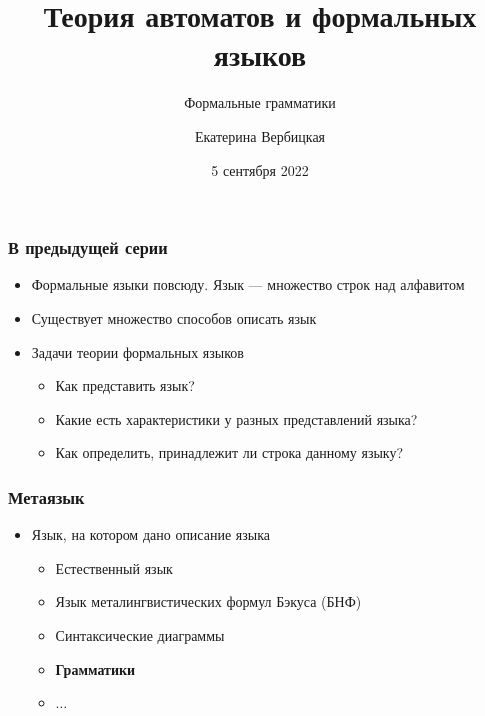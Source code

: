 \documentclass{beamer}
\title[]{Теория автоматов и формальных языков}
\subtitle[]{Формальные грамматики}
\institute[]{
НИУ-ВШЭ\\
}
\author[]{Екатерина Вербицкая}
\date{5 сентября 2022}
\begin{document}
{
  \begin{frame}
    \titlepage
  \end{frame}
}

\begin{frame}[fragile]
  \transwipe[direction=90]
  \frametitle{В предыдущей серии}
  \begin{itemize}
    \item Формальные языки повсюду. Язык --- множество строк над алфавитом
    \item Существует множество способов описать язык
    \item Задачи теории формальных языков
    \begin{itemize}
      \item Как представить язык?
      \item Какие есть характеристики у разных представлений языка?
      \item Как определить, принадлежит ли строка данному языку?
    \end{itemize}
  \end{itemize}
\end{frame}

\begin{frame}[fragile]
  \transwipe[direction=90]
  \frametitle{Метаязык}
  \begin{itemize}
    \item Язык, на котором дано описание языка
    \begin{itemize}
      \item Естественный язык
      \item Язык металингвистических формул Бэкуса (БНФ)
      \item Синтаксические диаграммы
      \item \textbf{Грамматики}
      \item $\dots$
    \end{itemize}
  \end{itemize}
\end{frame}
\end{document}
